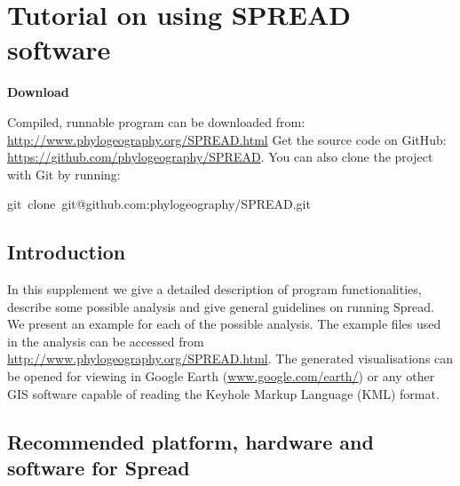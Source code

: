 \chapter{Tutorial on using SPREAD software\label{app:spread_tuto}}

% 

\begin{flushleft}
\textbf{Download}
\par\end{flushleft}
Compiled, runnable program can be downloaded from: \url{http://www.phylogeography.org/SPREAD.html}
Get the source code on GitHub: \url{https://github.com/phylogeography/SPREAD}.
You can also clone the project with Git by running:

\begin{lyxcode}
git~clone~git@github.com:phylogeography/SPREAD.git
\end{lyxcode}

\section{Introduction}

In this supplement we give a detailed description of program functionalities, describe some possible analysis and give general guidelines on running Spread. 
We present an example for each of the possible analysis. 
The example files used in the analysis can be accessed from \url{http://www.phylogeography.org/SPREAD.html}.
The generated visualisations can be opened for viewing in Google Earth (\url{www.google.com/earth/}) or any other GIS software capable of reading the Keyhole Markup Language (KML) format.


\section{Recommended platform, hardware and software for Spread}

